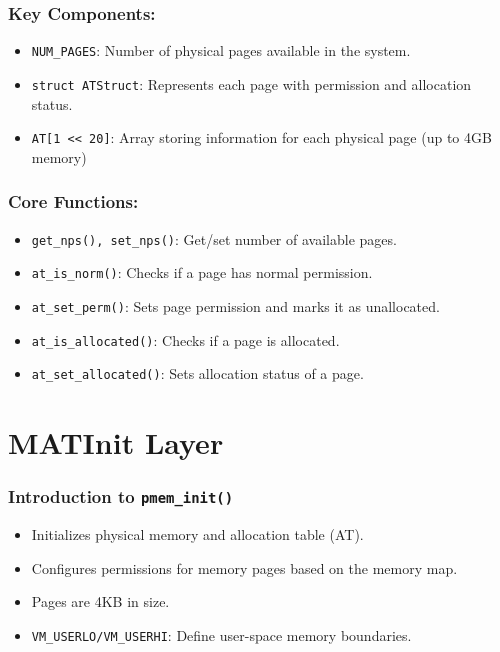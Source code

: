 \documentclass{beamer}
\begin{document}
	
	\begin{frame}
		\frametitle{Key Components:}
		
		\begin{itemize}
			\item \texttt{NUM\_PAGES}: Number of physical pages available in the system.
			\item \texttt{struct ATStruct}: Represents each page with permission and allocation status.
			\item \texttt{AT[1 << 20]}: Array storing information for each physical page (up to 4GB memory)
		\end{itemize}
	\end{frame}
	
	\begin{frame}
		\frametitle{Core Functions:}
		
		\begin{itemize}
			\item \texttt{get\_nps(), set\_nps()}: Get/set number of available pages.
			\item \texttt{at\_is\_norm()}: Checks if a page has normal permission.
			\item \texttt{at\_set\_perm()}: Sets page permission and marks it as unallocated.
			\item \texttt{at\_is\_allocated()}: Checks if a page is allocated.
			\item \texttt{at\_set\_allocated()}: Sets allocation status of a page.
		\end{itemize}
		
	\end{frame}
	
	
	\section{MATInit Layer}
	
	\begin{frame}
		\frametitle{Introduction to \texttt{pmem\_init()}}
		\begin{itemize}
			\item Initializes physical memory and allocation table (AT).
			\item Configures permissions for memory pages based on the memory map.
			\item Pages are 4KB in size.
			\item \texttt{VM\_USERLO/VM\_USERHI}: Define user-space memory boundaries.
		\end{itemize}
	\end{frame}
	
\end{document}
